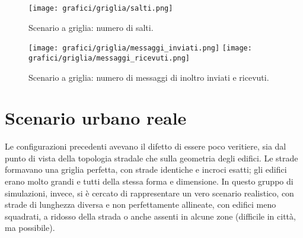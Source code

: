 %
\begin{figure}[htbp]
	\centering
		\texttt{[image: grafici/griglia/salti.png]}
\caption{Scenario a griglia: numero di salti.\label{fig:risultati-griglia-salti}}
\end{figure}
%
\begin{figure}[htbp]
	\centering
		\texttt{[image: grafici/griglia/messaggi\_inviati.png]}
		\texttt{[image: grafici/griglia/messaggi\_ricevuti.png]}
\caption{Scenario a griglia: numero di messaggi di inoltro inviati e ricevuti.\label{fig:risultati-griglia-messaggi}}
\end{figure}
\clearpage
%
%
\section{Scenario urbano reale} %
Le configurazioni precedenti avevano il difetto di essere poco veritiere, sia dal punto di vista della topologia stradale
che sulla geometria degli edifici.
Le strade formavano una griglia perfetta, con strade identiche e incroci esatti;
gli edifici erano molto grandi e tutti della stessa forma e dimensione.
In questo gruppo di simulazioni, invece, si è cercato di rappresentare un vero scenario realistico,
con strade di lunghezza diversa e non perfettamente allineate,
con edifici meno squadrati, a ridosso della strada o anche assenti in alcune zone (difficile in città, ma possibile).

